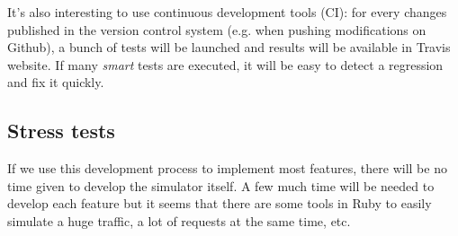 It's also interesting to use continuous development tools (CI): for every changes published in the version control system (e.g. when pushing modifications on Github), a bunch of tests will be launched and results will be available in Travis website. If many \textit{smart} tests are executed, it will be easy to detect a regression and fix it quickly.

\subsection{Stress tests}

If we use this development process to implement most features, there will be no time given to develop the simulator itself. A few much time will be needed to develop each feature but it seems that there are some tools in Ruby to easily simulate a huge traffic, a lot of requests at the same time, etc.